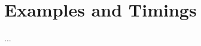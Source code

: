 \documentclass[main.tex]{subfiles}
\begin{document}
  \section{Examples and Timings}\label{sec:strat_pm}

  ...
 
\biblio
\end{document}
